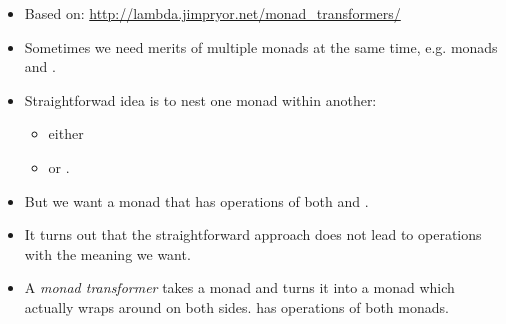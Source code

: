 \documentclass{beamer}
\newcommand{\tmem}[1]{{\em #1\/}}
\begin{document}
\begin{itemize}
  \item Based on:
  \href{http://lambda.jimpryor.net/monad_transformers/}{http://lambda.jimpryor.net/monad\_transformers/}
  
  \item Sometimes we need merits of multiple monads at the same time, e.g.
  monads {} and {}.
  
  \item Straightforwad idea is to nest one monad within another:
  \begin{itemize}
    \item either {}{}{}{}{}{}{}
    
    \item or {}{}{}{}{}{}{}.
  \end{itemize}
  \item But we want a monad that has operations of both {} and
  {}.
  
  \item It turns out that the straightforward approach does not lead to
  operations with the meaning we want.
  
  \item A {\tmem{monad transformer}} {} takes a monad {}
  and turns it into a monad {} which
  actually wraps around {} on both sides.
  {} has operations of both monads.
  

\end{itemize}
\end{document}
